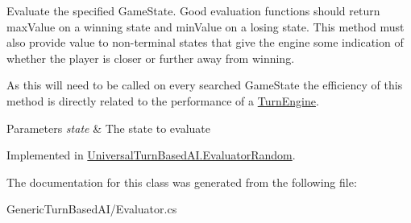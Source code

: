 Evaluate the specified Game\+State. Good evaluation functions should return max\+Value on a winning state and min\+Value on a losing state. This method must also provide value to non-\/terminal states that give the engine some indication of whether the player is closer or further away from winning. 

As this will need to be called on every searched Game\+State the efficiency of this method is directly related to the performance of a \hyperlink{class_universal_turn_based_a_i_1_1_turn_engine}{Turn\+Engine}. 


\begin{DoxyParams}{Parameters}
{\em state} & The state to evaluate\\
\hline
\end{DoxyParams}


Implemented in \hyperlink{class_universal_turn_based_a_i_1_1_evaluator_random_aee84168b526ec481fa4b811f3172f22b}{Universal\+Turn\+Based\+A\+I.\+Evaluator\+Random}.



The documentation for this class was generated from the following file\+:\begin{DoxyCompactItemize}
\item 
Generic\+Turn\+Based\+A\+I/Evaluator.\+cs\end{DoxyCompactItemize}
